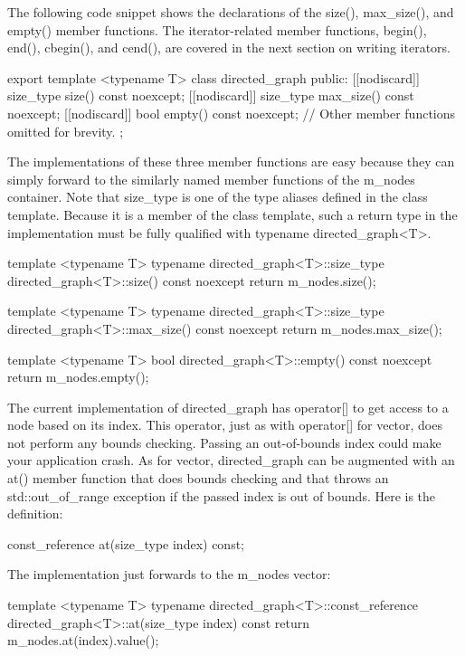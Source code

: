 The following code snippet shows the declarations of the size(), max\_size(), and empty() member functions. The iterator-related member functions, begin(), end(), cbegin(), and cend(), are covered in the next section on writing iterators.

\begin{cpp}
export template <typename T>
class directed_graph
{
    public:
        [[nodiscard]] size_type size() const noexcept;
        [[nodiscard]] size_type max_size() const noexcept;
        [[nodiscard]] bool empty() const noexcept;
        // Other member functions omitted for brevity.
};
\end{cpp}

The implementations of these three member functions are easy because they can simply forward to the similarly named member functions of the m\_nodes container. Note that size\_type is one of the type aliases defined in the class template. Because it is a member of the class template, such a return type in the implementation must be fully qualified with typename directed\_graph<T>.

\begin{cpp}
template <typename T>
typename directed_graph<T>::size_type directed_graph<T>::size() const noexcept
{
    return m_nodes.size();
}

template <typename T>
typename directed_graph<T>::size_type directed_graph<T>::max_size() const noexcept
{
    return m_nodes.max_size();
}

template <typename T>
bool directed_graph<T>::empty() const noexcept
{
    return m_nodes.empty();
}
\end{cpp}

The current implementation of directed\_graph has operator[] to get access to a node based on its index. This operator, just as with operator[] for vector, does not perform any bounds checking. Passing an out-of-bounds index could make your application crash. As for vector, directed\_graph can be augmented with an at() member function that does bounds checking and that throws an std::out\_of\_range exception if the passed index is out of bounds. Here is the definition:

\begin{cpp}
const_reference at(size_type index) const;
\end{cpp}

The implementation just forwards to the m\_nodes vector:

\begin{cpp}
template <typename T>
typename directed_graph<T>::const_reference
    directed_graph<T>::at(size_type index) const
{
    return m_nodes.at(index).value();
}
\end{cpp}

